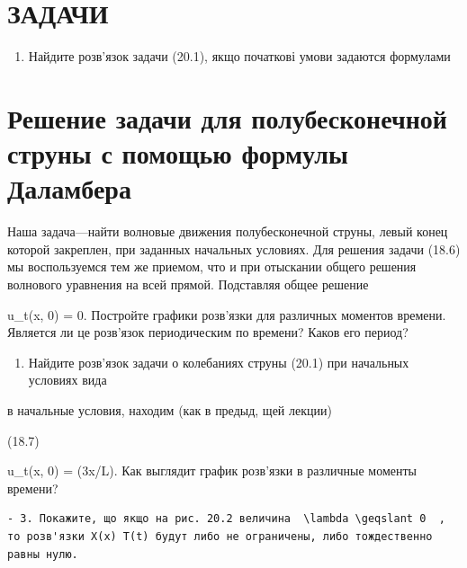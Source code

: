 \documentclass[
  ukrainian,
]{article}
\providecommand{\tightlist}{%
  \setlength{\itemsep}{0pt}\setlength{\parskip}{0pt}}
\begin{document}
\section{ЗАДАЧИ}\label{ux437ux430ux434ux430ux447ux438-4}

\begin{enumerate}
\def\labelenumi{\arabic{enumi}.}
\tightlist
\item
  Найдите розв'язок задачи (20.1), якщо початкові умови задаются
  формулами
\end{enumerate}

\section{Решение задачи для полубесконечной струны с помощью формулы
Даламбера}\label{ux440ux435ux448ux435ux43dux438ux435-ux437ux430ux434ux430ux447ux438-ux434ux43bux44f-ux43fux43eux43bux443ux431ux435ux441ux43aux43eux43dux435ux447ux43dux43eux439-ux441ux442ux440ux443ux43dux44b-ux441-ux43fux43eux43cux43eux449ux44cux44e-ux444ux43eux440ux43cux443ux43bux44b-ux434ux430ux43bux430ux43cux431ux435ux440ux430-1}

Наша задача---найти волновые движения полубесконечной струны, левый
конец которой закреплен, при заданных начальных условиях. Для решения
задачи (18.6) мы воспользуемся тем же приемом, что и при отыскании
общего решения волнового уравнения на всей прямой. Подставляя общее
решение

u\_t(x, 0) = 0. Постройте графики розв'язки для различных моментов
времени. Является ли це розв'язок периодическим по времени? Каков его
период?

\begin{enumerate}
\def\labelenumi{\arabic{enumi}.}
\setcounter{enumi}{1}
\tightlist
\item
  Найдите розв'язок задачи о колебаниях струны (20.1) при начальных
  условиях вида
\end{enumerate}

в начальные условия, находим (как в предыд, щей лекции)

(18.7)

u\_t(x, 0) = \sin(3\pi x/L). Как выглядит график розв'язки в различные
моменты времени?

\begin{verbatim}
- 3. Покажите, що якщо на рис. 20.2 величина  \lambda \geqslant 0  , то розв'язки X(x) T(t) будут либо не ограничены, либо тождественно равны нулю.
\end{verbatim}
\end{document}
